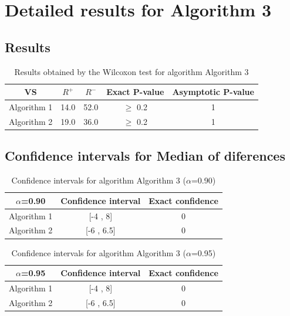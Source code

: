 \documentclass[a4paper,10pt]{article}
\begin{document}
 \clearpage 


\section{Detailed results for Algorithm 3}


\subsection{Results}

\begin{table}[!htp]
\centering\small
\begin{tabular}{
|c|c|c|c|c|}
\hline
 VS & $R^{+}$ & $R^{-}$ & Exact P-value & Asymptotic P-value \\ \hline 
Algorithm 1 & 14.0 & 52.0 & $\geq$ 0.2 & 1\\ \hline 
Algorithm 2 & 19.0 & 36.0 & $\geq$ 0.2 & 1\\ \hline 

\end{tabular}
\caption{Results obtained by the Wilcoxon test for algorithm Algorithm 3}
\end{table}

\subsection{Confidence intervals for Median of diferences}

\begin{table}[!htp]
\centering\small
\begin{tabular}{
|c|c|c|}
\hline
 $\alpha$=0.90 & Confidence interval & Exact confidence \\ \hline 
Algorithm 1 & [-4 , 8] & 0\\ \hline 
Algorithm 2 & [-6 , 6.5] & 0\\ \hline 

\end{tabular}
\caption{Confidence intervals for algorithm Algorithm 3 ($\alpha$=0.90)}
\end{table}
\begin{table}[!htp]
\centering\small
\begin{tabular}{
|c|c|c|}
\hline
 $\alpha$=0.95 & Confidence interval & Exact confidence \\ \hline 
Algorithm 1 & [-4 , 8] & 0\\ \hline 
Algorithm 2 & [-6 , 6.5] & 0\\ \hline 

\end{tabular}
\caption{Confidence intervals for algorithm Algorithm 3 ($\alpha$=0.95)}
\end{table}

 \clearpage 
\end{document}
